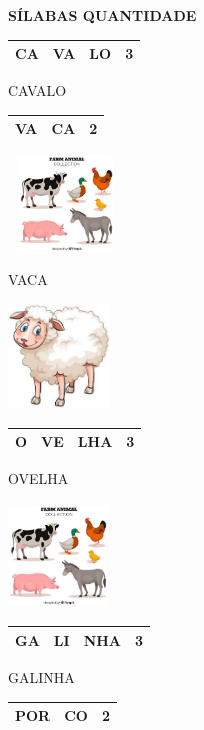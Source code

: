 \textbf{SÍLABAS QUANTIDADE}

\begin{longtable}[]{@{}llll@{}}
\toprule
CA & VA & LO & 3\tabularnewline
\bottomrule
\end{longtable}

CAVALO

\begin{longtable}[]{@{}lll@{}}
\toprule
VA & CA & 2\tabularnewline
\bottomrule
\end{longtable}

\includegraphics[width=1.19577in,height=0.98873in]{media/image27.jpg}

VACA

\includegraphics[width=1.06250in,height=1.09969in]{media/image28.jpg}

\begin{longtable}[]{@{}llll@{}}
\toprule
O & VE & LHA & 3\tabularnewline
\bottomrule
\end{longtable}

OVELHA

\includegraphics[width=1.03125in,height=1.09419in]{media/image27.jpg}

\begin{longtable}[]{@{}llll@{}}
\toprule
GA & LI & NHA & 3\tabularnewline
\bottomrule
\end{longtable}

GALINHA

\begin{longtable}[]{@{}lll@{}}
\toprule
POR & CO & 2\tabularnewline
\bottomrule
\end{longtable}

